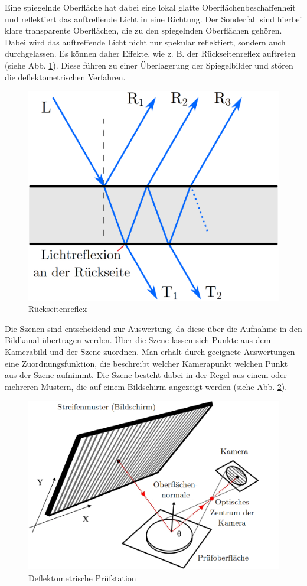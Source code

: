 \documentclass[ngerman,11pt,twocolumn,a4paper]{article}
\begin{document}
	\par
	Eine spiegelnde Oberfläche hat dabei eine lokal glatte Oberflächenbeschaffenheit und reflektiert das auftreffende Licht in eine Richtung.
	Der Sonderfall sind hierbei klare transparente Oberflächen, die zu den spiegelnden Oberflächen gehören.
	Dabei wird das auftreffende Licht nicht nur spekular reflektiert, sondern auch durchgelassen.
	Es können daher Effekte, wie z. B. der Rückseitenreflex auftreten (siehe Abb. \ref{img:rueckseitenreflex}).
	Diese führen zu einer Überlagerung der Spiegelbilder und stören die deflektometrischen Verfahren.
	\begin{figure}[H]
		\centering
		\includegraphics[width=0.75\columnwidth]{rueckseitenreflex}
		\caption{Rückseitenreflex \cite{deflektometrieScheiben}}
		\label{img:rueckseitenreflex}
	\end{figure}
	
	Die Szenen sind entscheidend zur Auswertung, da diese über die Aufnahme in den Bildkanal übertragen werden.
	Über die Szene lassen sich Punkte aus dem Kamerabild und der Szene zuordnen.
	Man erhält durch geeignete Auswertungen eine Zuordnungsfunktion, die beschreibt welcher Kamerapunkt welchen Punkt aus der Szene aufnimmt.
	Die Szene besteht dabei in der Regel aus einem oder mehreren Mustern, die auf einem Bildschirm angezeigt werden (siehe Abb. \ref{img:pruefstation}).
	\begin{figure}[H]
		\centering
		\includegraphics[width=\columnwidth]{nature-articel-nr1}
		\caption{Deflektometrische Prüfstation \cite{aufbau}}
		\label{img:pruefstation}
	\end{figure}
	
\end{document}
